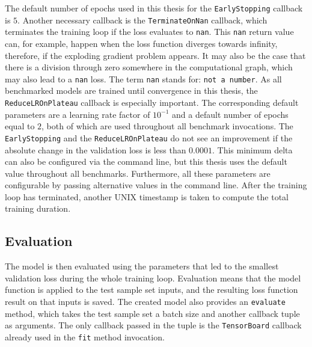 \documentclass[draft,final]{vutinfth} %
\begin{document}
    The default number of epochs used in this thesis for the \texttt{EarlyStopping} callback is $5$.
    Another necessary callback is the \texttt{TerminateOnNan} callback, which terminates the training loop if the loss evaluates to \texttt{nan}.
    This \texttt{nan} return value can, for example, happen when the loss function diverges towards infinity, therefore, if the exploding gradient problem appears.
    It may also be the case that there is a division through zero somewhere in the computational graph, which may also lead to a \texttt{nan} loss.
    The term \texttt{nan} stands for: \texttt{not a number}.
    As all benchmarked models are trained until convergence in this thesis, the \texttt{ReduceLROnPlateau} callback is especially important.
    The corresponding default parameters are a learning rate factor of $10^{-1}$ and a default number of epochs equal to $2$, both of which are used throughout all benchmark invocations.
    The \texttt{EarlyStopping} and the \texttt{ReduceLROnPlateau} do not see an improvement if the absolute change in the validation loss is less than $0.0001$.
    This minimum delta can also be configured via the command line, but this thesis uses the default value throughout all benchmarks.
    Furthermore, all these parameters are configurable by passing alternative values in the command line.
    After the training loop has terminated, another UNIX timestamp is taken to compute the total training duration.

    \subsection{Evaluation} \label{benchmark_evaluation}
    The model is then evaluated using the parameters that led to the smallest validation loss during the whole training loop.
    Evaluation means that the model function is applied to the test sample set inputs, and the resulting loss function result on that inputs is saved.
    The created model also provides an \texttt{evaluate} method, which takes the test sample set a batch size and another callback tuple as arguments.
    The only callback passed in the tuple is the \texttt{TensorBoard} callback already used in the \texttt{fit} method invocation.
\end{document}
